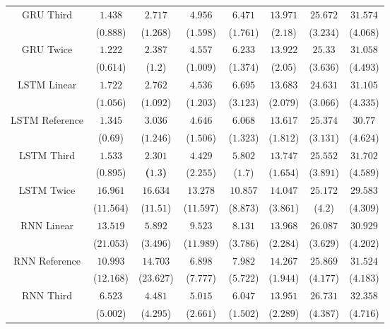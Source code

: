 \begin{table}[!ht]
{\begin{tabular}{|c|c|c|c|c|c|c|c|}
			\multirow{2}{*}{GRU Third} & $1.438$ & $2.717$ & $4.956$ & $6.471$ & $13.971$ & $25.672$ & $31.574$ \\
			 & ($0.888$) & ($1.268$) & ($1.598$) & ($1.761$) & ($2.18$) & ($3.234$) & ($4.068$) \\ \hline
			\multirow{2}{*}{GRU Twice} & $1.222$ & $2.387$ & $4.557$ & $6.233$ & $13.922$ & $25.33$ & $31.058$ \\
			 & ($0.614$) & ($1.2$) & ($1.009$) & ($1.374$) & ($2.05$) & ($3.636$) & ($4.493$) \\ \hline
			\multirow{2}{*}{LSTM Linear} & $1.722$ & $2.762$ & $4.536$ & $6.695$ & $13.683$ & $24.631$ & $31.105$ \\
			 & ($1.056$) & ($1.092$) & ($1.203$) & ($3.123$) & ($2.079$) & ($3.066$) & ($4.335$) \\ \hline
			\multirow{2}{*}{LSTM Reference} & $1.345$ & $3.036$ & $4.646$ & $6.068$ & $13.617$ & $25.374$ & $30.77$ \\
			 & ($0.69$) & ($1.246$) & ($1.506$) & ($1.323$) & ($1.812$) & ($3.131$) & ($4.624$) \\ \hline
			\multirow{2}{*}{LSTM Third} & $1.533$ & $\mathbf{2.301}$ & $4.429$ & $5.802$ & $13.747$ & $25.552$ & $31.702$ \\
			 & ($0.895$) & \textbf{(}$\mathbf{1.3}$\textbf{)} & ($2.255$) & ($1.7$) & ($1.654$) & ($3.891$) & ($4.589$) \\ \hline
			\multirow{2}{*}{LSTM Twice} & $16.961$ & $16.634$ & $13.278$ & $10.857$ & $14.047$ & $25.172$ & $29.583$ \\
			 & ($11.564$) & ($11.51$) & ($11.597$) & ($8.873$) & ($3.861$) & ($4.2$) & ($4.309$) \\ \hline
			\multirow{2}{*}{RNN Linear} & $13.519$ & $5.892$ & $9.523$ & $8.131$ & $13.968$ & $26.087$ & $30.929$ \\
			 & ($21.053$) & ($3.496$) & ($11.989$) & ($3.786$) & ($2.284$) & ($3.629$) & ($4.202$) \\ \hline
			\multirow{2}{*}{RNN Reference} & $10.993$ & $14.703$ & $6.898$ & $7.982$ & $14.267$ & $25.869$ & $31.524$ \\
			 & ($12.168$) & ($23.627$) & ($7.777$) & ($5.722$) & ($1.944$) & ($4.177$) & ($4.183$) \\ \hline
			\multirow{2}{*}{RNN Third} & $6.523$ & $4.481$ & $5.015$ & $6.047$ & $13.951$ & $26.731$ & $32.358$ \\
			 & ($5.002$) & ($4.295$) & ($2.661$) & ($1.502$) & ($2.289$) & ($4.387$) & ($4.716$) \\ \hline

\end{tabular}}
\end{table}
